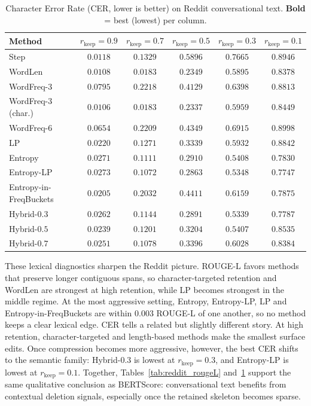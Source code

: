 \documentclass[11pt]{article}
\newcommand{\rkeep}{r_{\mathrm{keep}}}
\begin{document}
\begin{table}[tbp]
\centering
\small
\caption{Character Error Rate (CER, lower is better) on Reddit conversational text.
\textbf{Bold} = best (lowest) per column.}
\label{tab:reddit_cer}
\begin{tabular}{lccccc}
\toprule
\textbf{Method} & $\rkeep{=}0.9$ & $\rkeep{=}0.7$ & $\rkeep{=}0.5$ & $\rkeep{=}0.3$ & $\rkeep{=}0.1$ \\
\midrule
Step              & $0.0118$ & $0.1329$ & $0.5896$ & $0.7665$ & $0.8946$ \\
WordLen           & $0.0108$ & $\mathbf{0.0183}$ & $0.2349$ & $0.5895$ & $0.8378$ \\
WordFreq-3         & $0.0795$ & $0.2218$ & $0.4129$ & $0.6398$ & $0.8813$ \\
WordFreq-3 (char.) & $\mathbf{0.0106}$ & $\mathbf{0.0183}$ & $\mathbf{0.2337}$ & $0.5959$ & $0.8449$ \\
WordFreq-6         & $0.0654$ & $0.2209$ & $0.4349$ & $0.6915$ & $0.8998$ \\
LP            & $0.0220$ & $0.1271$ & $0.3339$ & $0.5932$ & $0.8842$ \\
Entropy           & $0.0271$ & $0.1111$ & $0.2910$ & $0.5408$ & $0.7830$ \\
Entropy-LP        & $0.0273$ & $0.1072$ & $0.2863$ & $0.5348$ & $\mathbf{0.7747}$ \\
Entropy-in-FreqBuckets & $0.0205$ & $0.2032$ & $0.4411$ & $0.6159$ & $0.7875$ \\
Hybrid-$0.3$      & $0.0262$ & $0.1144$ & $0.2891$ & $\mathbf{0.5339}$ & $0.7787$ \\
Hybrid-$0.5$      & $0.0239$ & $0.1201$ & $0.3204$ & $0.5407$ & $0.8535$ \\
Hybrid-$0.7$      & $0.0251$ & $0.1078$ & $0.3396$ & $0.6028$ & $0.8384$ \\
\bottomrule
\end{tabular}
\end{table}

These lexical diagnostics sharpen the Reddit picture. ROUGE-L favors methods that
preserve longer contiguous spans, so character-targeted retention and WordLen are
strongest at high retention, while LP becomes strongest in the middle regime.
At the most aggressive setting, Entropy, Entropy-LP, LP and Entropy-in-FreqBuckets
are within $0.003$ ROUGE-L of one another, so no method keeps a clear lexical edge. CER tells a related but slightly different story. At high
retention, character-targeted and length-based methods make the smallest surface
edits. Once compression becomes more aggressive, however, the best CER shifts to
the semantic family: Hybrid-$0.3$ is lowest at $\rkeep = 0.3$, and Entropy-LP is
lowest at $\rkeep = 0.1$. Together, Tables~\ref{tab:reddit_rougeL}
and~\ref{tab:reddit_cer} support the same qualitative conclusion as BERTScore:
conversational text benefits from contextual deletion signals, especially once
the retained skeleton becomes sparse.
\end{document}
